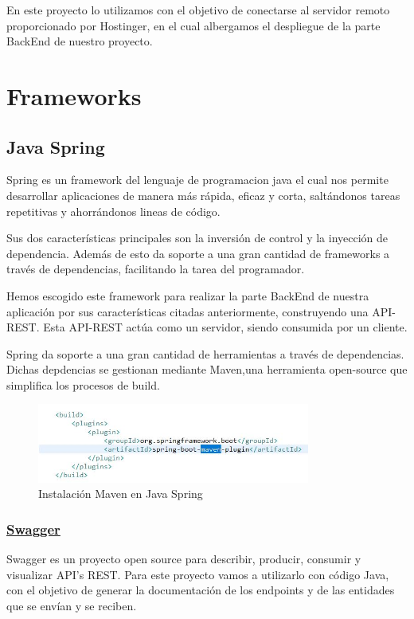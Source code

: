      En este proyecto lo utilizamos con el objetivo de conectarse al servidor remoto proporcionado por Hostinger\cite{hostinger}, en el cual albergamos el despliegue de la parte BackEnd de nuestro proyecto.
     
     
     \section{Frameworks}
     
     \subsection{Java Spring}
     Spring es un framework del lenguaje de programacion java el cual nos permite desarrollar aplicaciones de manera más rápida, eficaz y corta, saltándonos tareas repetitivas y ahorrándonos lineas de código\cite{javaspring}.
     \newline
     
     Sus dos características principales son la inversión de control y la inyección de dependencia. Además de esto da soporte a una gran cantidad de frameworks a través de dependencias, facilitando la tarea del programador.
     \newline
     
     Hemos escogido este framework para realizar la parte BackEnd de nuestra aplicación por sus características citadas anteriormente, construyendo una API-REST. Esta API-REST actúa como un servidor, siendo consumida por un cliente.
     \newline
    
    Spring da soporte a una gran cantidad de herramientas a través de dependencias. Dichas depdencias se gestionan mediante Maven,una herramienta open-source que simplifica los procesos de build.
    
    \begin{figure}[h]
    \centering
    \includegraphics[width=0.8\textwidth]{images/maven}
    \caption{Instalación Maven en Java Spring}
    \end{figure}
    
    

        \subsubsection{\underline{Swagger}}
        Swagger es un proyecto open source para describir, producir, consumir y visualizar API’s REST. Para este proyecto vamos a utilizarlo con código Java, con el objetivo de generar la documentación de los endpoints y de las entidades que se envían y se reciben.


